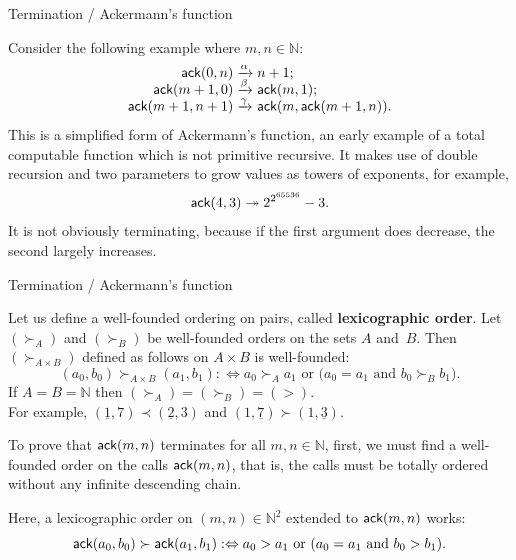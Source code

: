 %
\begin{frame}{Termination / Ackermann's function}

Consider the following example where \(m,n \in \mathbb{N}\):
\begin{equation*}
\begin{array}{@{}r@{\;}l@{\;}l@{}}
\fun{ack}(0,n)     & \smashedrightarrow{\alpha} & n+1;\\
\fun{ack}(m+1,0)   & \smashedrightarrow{\beta} & \fun{ack}(m,1);\\
\fun{ack}(m+1,n+1) & \smashedrightarrow{\gamma}
                   & \fun{ack}(m,\fun{ack}(m+1,n)).
\end{array}
\end{equation*}
This is a simplified form of Ackermann's function, an early example of
a total computable function which is not primitive recursive. It makes
use of double recursion and two parameters to grow values as towers of
exponents, for example,
\begin{equation*}
  \textsf{ack}(4,3) \twoheadrightarrow 2^{2^{65536}} - 3.
\end{equation*}
It is not obviously terminating, because if the first argument does
decrease, the second largely increases.

\end{frame}

%
\begin{frame}{Termination / Ackermann's function}

Let us define a well\hyp{}founded ordering on pairs, called
\textbf{lexicographic order}. Let \((\succ_A)\) and \((\succ_B)\) be
well\hyp{}founded orders on the sets \(A\) and~\(B\). Then \({(\succ_{A
  \times B})}\) defined as follows on \(A \times B\) is
well\hyp{}founded:
\begin{equation*}
(a_0,b_0) \succ_{A \times B} (a_1,b_1) :\Leftrightarrow \text{\(a_0
    \succ_A a_1\) or (\(a_0 = a_1\) and \(b_0 \succ_B b_1\)).}
\end{equation*}
If \(A=B=\mathbb{N}\) then \((\succ_A) = (\succ_B) = (>)\). \\ For
example, \((\underline{1},7) \prec (\underline{2},3)\) and
\((1,\underline{7}) \succ (1,\underline{3})\).

\bigskip

To prove that \(\textsf{ack}(m,n)\) terminates for all \(m,n \in
\mathbb{N}\), first, we must find a well\hyp{}founded order on the
calls \(\textsf{ack}(m,n)\), that is, the calls must be totally ordered
without any infinite descending chain.

\bigskip

Here, a lexicographic order on \((m,n) \in \mathbb{N}^2\) extended to
\(\textsf{ack}(m,n)\) works:
\begin{equation*}
\textsf{ack}(a_0,b_0) \succ \textsf{ack}(a_1,b_1) :\Leftrightarrow
\text{\(a_0 > a_1\) or (\(a_0 = a_1\) and \(b_0 > b_1\)).}
\end{equation*}

\end{frame}

